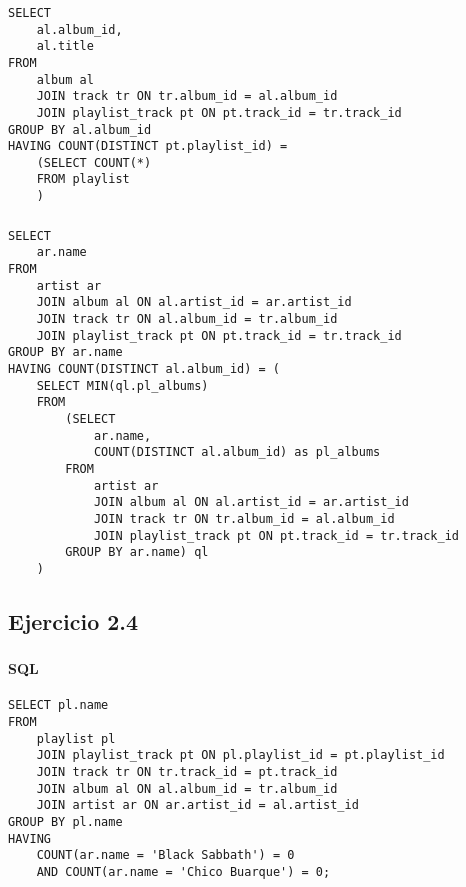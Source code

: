 \newpage
\subsubsection{}
\begin{verbatim}
SELECT
	al.album_id,
	al.title
FROM
	album al
	JOIN track tr ON tr.album_id = al.album_id
	JOIN playlist_track pt ON pt.track_id = tr.track_id
GROUP BY al.album_id
HAVING COUNT(DISTINCT pt.playlist_id) = 
	(SELECT COUNT(*) 
	FROM playlist
	)	
\end{verbatim}

\subsubsection{}
\begin{verbatim}
SELECT
	ar.name
FROM
	artist ar
	JOIN album al ON al.artist_id = ar.artist_id
	JOIN track tr ON al.album_id = tr.album_id
	JOIN playlist_track pt ON pt.track_id = tr.track_id
GROUP BY ar.name
HAVING COUNT(DISTINCT al.album_id) = (
	SELECT MIN(ql.pl_albums)
	FROM
		(SELECT
			ar.name, 
			COUNT(DISTINCT al.album_id) as pl_albums
		FROM 
			artist ar
			JOIN album al ON al.artist_id = ar.artist_id
			JOIN track tr ON tr.album_id = al.album_id
			JOIN playlist_track pt ON pt.track_id = tr.track_id
		GROUP BY ar.name) ql
	)
\end{verbatim}

\newpage
\subsection{Ejercicio 2.4}
\subsubsection{}
\paragraph{SQL}
\begin{verbatim}
SELECT pl.name
FROM
	playlist pl
	JOIN playlist_track pt ON pl.playlist_id = pt.playlist_id
	JOIN track tr ON tr.track_id = pt.track_id
	JOIN album al ON al.album_id = tr.album_id
	JOIN artist ar ON ar.artist_id = al.artist_id
GROUP BY pl.name
HAVING 
	COUNT(ar.name = 'Black Sabbath') = 0 
	AND COUNT(ar.name = 'Chico Buarque') = 0;
\end{verbatim}


